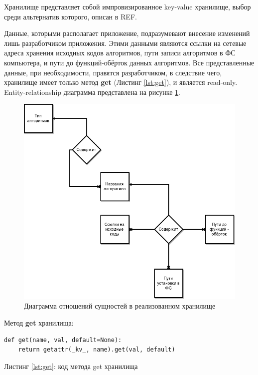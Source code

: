 Хранилище представляет собой импровизированное key-value хранилище, выбор среди
альтернатив которого, описан в REF.

Данные, которыми располагает приложение, подразумевают внесение изменений лишь
разработчиком приложения. Этими данными являются ссылки на сетевые адреса
хранения исходных кодов алгоритмов, пути записи алгоритмов в ФС компьютера, и
пути до функций-обёрток данных алгоритмов. Все представленные данные, при
необходимости, правятся разработчиком, в следствие чего, хранилище имеет только
метод \textbf{get} (Листинг \ref{lst:get}), и является read-only. Entity-relationship диаграмма
представлена на рисунке \ref{er}.

\begin{figure}[h]
    \centering
    \includegraphics[width=\textwidth]{images/er}
    \caption{Диаграмма отношений сущностей в реализованном хранилище}\label{er}
\end{figure}

\newpage
Метод \textbf{get} хранилища:

\begin{center}
\begin{lstlisting}
def get(name, val, default=None):
    return getattr(_kv_, name).get(val, default)
\end{lstlisting}\label{lst:get}
Листинг \ref{lst:get}: код метода get хранилища
\end{center}

